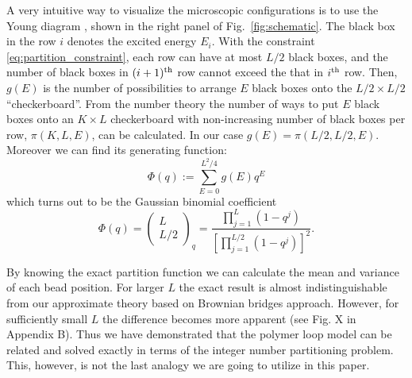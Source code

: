 \documentclass[aps,showpacs,twocolumn,floatfix,prx,superscriptaddress]{revtex4-1}
\begin{document}
A very intuitive way to visualize the microscopic configurations is to use the Young diagram \cite{andrews1998theory}, shown in the right panel of Fig.~\ref{fig:schematic}. The black box in the row $i$ denotes the excited energy $E_i$. With the constraint \eqref{eq:partition_constraint}, each row can have at most $L/2$ black boxes, and the number of black boxes in $(i+1)^{\rm th}$ row cannot exceed the that in $i^{\rm th}$ row.  Then, $g(E)$ is the number of possibilities to arrange $E$ black boxes onto the $L/2 \times L/2$ ``checkerboard''. From the number theory \cite{andrews1998theory} the number of ways to put $E$ black boxes onto an $K \times L$ checkerboard with non-increasing number of black boxes per row, $\pi (K,L,E)$, can be calculated. In our case $g(E)=\pi\left(L/2,L/2,E\right)$. Moreover we can find its generating function:
\begin{equation}
\Phi (q) := \sum_{E=0}^{L^2/4} g(E) q^E
\label{eq:generating}
\end{equation}
which turns out to be the Gaussian binomial coefficient
\begin{equation}
\Phi (q) = \left(\begin{array}{c} L \\ L/2 \end{array}\right)_q = \frac{\prod_{j=1}^{L} \left(1-q^j\right)}{\left[\prod_{j=1}^{L/2} \left(1-q^j\right)\right]^2}.
\label{eq:binomial}
\end{equation}

By knowing the exact partition function we can calculate the mean and variance of each bead position. For larger $L$ the exact result is almost indistinguishable from our approximate theory based on Brownian bridges approach. However, for sufficiently small $L$ the difference becomes more apparent (see Fig. X in Appendix B). Thus we have demonstrated that the polymer loop model can be related and solved exactly in terms of the integer number partitioning problem. This, however, is not the last analogy we are going to utilize in this paper.
\end{document}
